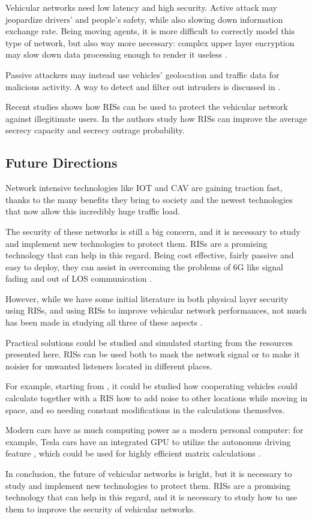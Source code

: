 Vehicular networks need low latency and high security. Active attack may jeopardize drivers' and people's safety, while also slowing down information exchange rate. Being moving agents, it is more difficult to correctly model this type of network, but also way more necessary: complex upper layer encryption may slow down data processing enough to render it useless \cite{8403278}.

Passive attackers may instead use vehicles' geolocation and traffic data for malicious activity. A way to detect and filter out intruders is discussed in \cite{8474336}.

Recent studies shows how RISs can be used to protect the vehicular network against illegitimate users. In \cite{makarfi2020reconfigurableintelligentsurfacesenabledvehicular} the authors study how RISs can improve the average secrecy capacity and secrecy outrage probability.

\subsection{Future Directions}

Network intensive technologies like IOT and CAV are gaining traction fast, thanks to the many benefits they bring to society and the newest technologies that now allow this incredibly huge traffic load.

The security of these networks is still a big concern, and it is necessary to study and implement new technologies to protect them. RISs are a promising technology that can help in this regard. Being cost effective, fairly passive and easy to deploy, they can assist in overcoming the problems of 6G like signal fading and out of LOS communication \cite{8796365}.

However, while we have some initial literature in both physical layer security using RISs, and using RISs to improve vehicular network performances, not much has been made in studying all three of these aspects \cite{makarfi2020reconfigurableintelligentsurfacesenabledvehicular}.

Practical solutions could be studied and simulated starting from the resources presented here. RISs can be used both to mask the network signal or to make it noisier for unwanted listeners located in different places.

For example, starting from \cite{4543070}, it could be studied how cooperating vehicles could calculate together with a RIS how to add noise to other locations while moving in space, and so needing constant modifications in the calculations themselves.

Modern cars have as much computing power as a modern personal computer: for example, Tesla cars have an integrated GPU to utilize the autonomus driving feature \cite{10586734}, which could be used for highly efficient matrix calculations \cite{1011452699470}.

In conclusion, the future of vehicular networks is bright, but it is necessary to study and implement new technologies to protect them. RISs are a promising technology that can help in this regard, and it is necessary to study how to use them to improve the security of vehicular networks.